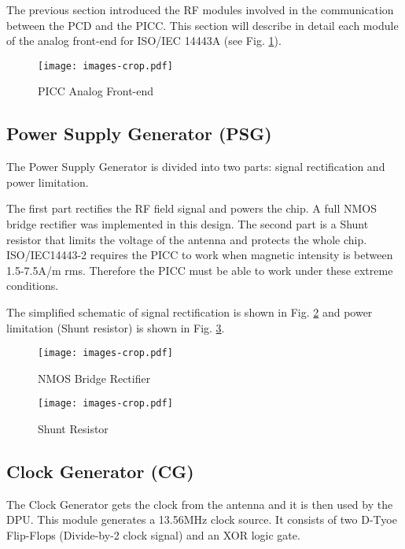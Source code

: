 The previous section introduced the RF modules involved in the communication between the PCD and the PICC. This section will describe in detail each module of the analog front-end for ISO/IEC 14443A (see Fig. \ref{fig:afe}).

\begin{figure}[]
  \centering
  \texttt{[image: images-crop.pdf]}
  \caption{PICC Analog Front-end}
  \label{fig:afe}
\end{figure}

\subsection{Power Supply Generator (PSG)}

The Power Supply Generator is divided into two parts: signal rectification and power limitation.

The first part rectifies the RF field signal and powers the chip. A full NMOS bridge rectifier \cite{rfid_rect1}\cite{rfid_rect2} was implemented in this design. The second part is a Shunt resistor that limits the voltage of the antenna and protects the whole chip. ISO/IEC14443-2 requires the PICC to work when magnetic intensity is between 1.5-7.5A/m rms. Therefore the PICC must be able to work under these extreme conditions.  

The simplified schematic of signal rectification is shown in Fig. \ref{fig:rect} and power limitation (Shunt resistor) is shown in Fig. \ref{fig:shunt}.

\begin{figure}[h]
  \centering
  \texttt{[image: images-crop.pdf]}
  \caption{NMOS Bridge Rectifier}
  \label{fig:rect}
\end{figure}

\begin{figure}[h]
  \centering
  \texttt{[image: images-crop.pdf]}
  \caption{Shunt Resistor}
  \label{fig:shunt}
\end{figure}

\subsection{Clock Generator (CG)}

The Clock Generator gets the clock from the antenna and it is then used by the DPU. This module generates a 13.56MHz clock source. It consists of two D-Tyoe Flip-Flops (Divide-by-2 clock signal) and an XOR logic gate. 

